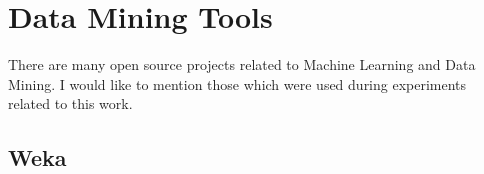 



\section{Data Mining Tools}
There are many open source projects related to Machine Learning and
Data Mining. I would like to mention those which were used during
experiments related to this work.

\subsection{Weka}

